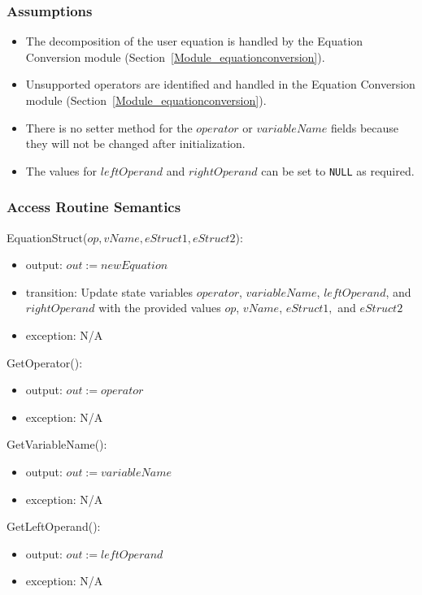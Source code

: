 \documentclass[12pt, titlepage]{article}
\begin{document}
\subsubsection{Assumptions}

\begin{itemize}
	\item The decomposition of the user equation is handled by the Equation 
	Conversion module (Section~\ref{Module_equationconversion}).
	\item Unsupported operators are identified and handled in the Equation 
	Conversion module (Section~\ref{Module_equationconversion}).
	\item There is no setter method for the $operator$ or $variableName$ fields 
	because they will not be changed after initialization.
	\item The values for $leftOperand$ and $rightOperand$ can be set to 
	\texttt{NULL} as required.
\end{itemize}

\subsubsection{Access Routine Semantics}

\noindent EquationStruct($op, vName, eStruct1, eStruct2$):
\begin{itemize}
	\item output: $out := newEquation$
	\item transition: Update state variables $operator$, $variableName$, 
	$leftOperand$, and $rightOperand$ with the provided values $op$, $vName$, 
	$eStruct1,$ and $eStruct2$
	\item exception: N/A
\end{itemize}

\noindent GetOperator():
\begin{itemize}
	\item output: $out := operator$
	\item exception: N/A
\end{itemize}

\noindent GetVariableName():
\begin{itemize}
	\item output: $out := variableName$
	\item exception: N/A
\end{itemize}

\noindent GetLeftOperand():
\begin{itemize}
	\item output: $out := leftOperand$
	\item exception: N/A
\end{itemize}
\end{document}
